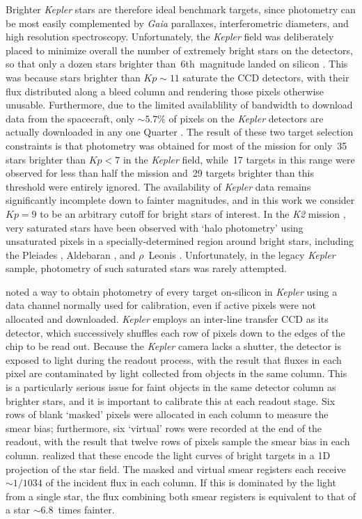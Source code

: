 \documentclass[a4paper,fleqn,usenatbib]{mnras}
\newcommand{\kepler}{\emph{Kepler}\xspace}
\newcommand{\ktwo}{\emph{K2}\xspace}
\newcommand{\gaia}{\emph{Gaia}\xspace}
\begin{document}
Brighter \kepler stars are therefore ideal benchmark targets, since photometry can be most easily complemented by \gaia parallaxes, interferometric diameters, and high resolution spectroscopy.  
Unfortunately, the \kepler field was deliberately placed to minimize overall the number of extremely bright stars on the detectors, so that only a dozen stars brighter than~6th~magnitude landed on silicon \citep{2010ApJ...713L..79K}. This was because stars brighter than $Kp \sim 11$ saturate the CCD detectors, with their flux distributed along a bleed column and rendering those pixels otherwise unusable. Furthermore, due to the limited availablility of bandwidth to download data from the spacecraft, only $\sim 5.7\%$ of pixels on the \kepler detectors are actually downloaded in any one Quarter \citep{2010ApJ...713L..87Jd}. The result of these two target selection constraints is that photometry was obtained for most of the mission for only~35 stars brighter than $Kp<7$ in the \kepler field, while~17 targets in this range were observed for less than half the mission and~29 targets brighter than this threshold were entirely ignored. The availability of \kepler data remains significantly incomplete down to fainter magnitudes, and in this work we consider $Kp=9$ to be an arbitrary cutoff for bright stars of interest. In the \ktwo mission \citep{k2early}, very saturated stars have been observed with `halo photometry' using unsaturated pixels in a specially-determined region around bright stars, including the Pleiades \citep{halo}, Aldebaran \citep{aldebaran}, and $\rho$~Leonis \citep{rholeo}. Unfortunately, in the legacy \kepler sample, photometry of such saturated stars was rarely attempted.

\citet{orig_smear} noted a way to obtain photometry of every target on-silicon in \kepler using a data channel normally used for calibration, even if active pixels were not allocated and downloaded. \kepler employs an inter-line transfer CCD as its detector, which successively shuffles each row of pixels down to the edges of the chip to be read out. Because the \kepler camera lacks a shutter, the detector is exposed to light during the readout process, with the result that fluxes in each pixel are contaminated by light collected from objects in the same column. This is a particularly serious issue for faint objects in the same detector column as brighter stars, and it is important to calibrate this at each readout stage. Six rows of blank `masked' pixels were allocated in each column to measure the smear bias; furthermore, six `virtual' rows were recorded at the end of the readout, with the result that twelve rows of pixels sample the smear bias in each column. \citet{orig_smear} realized that these encode the light curves of bright targets in a 1D projection of the star field. The masked and virtual smear registers each receive $\sim 1/1034$ of the incident flux in each column. If this is dominated by the light from a single star, the flux combining both smear registers is equivalent to that of a star $\sim 6.8$~times fainter. 
\end{document}
